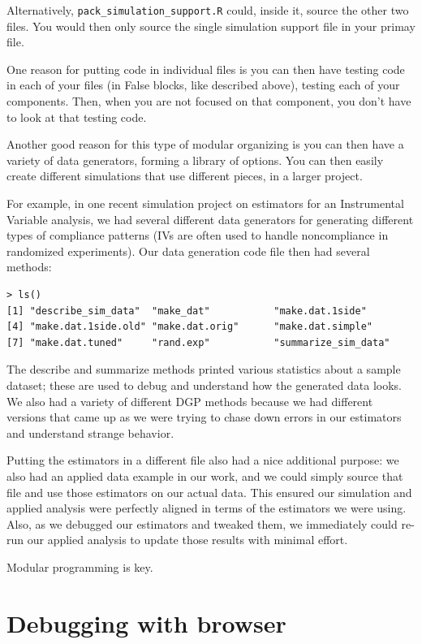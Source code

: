\documentclass[
]{book}
\begin{document}
Alternatively, \texttt{pack\_simulation\_support.R} could, inside it, source the other two files.
You would then only source the single simulation support file in your primay file.

One reason for putting code in individual files is you can then have testing code in each of your files (in False blocks, like described above), testing each of your components.
Then, when you are not focused on that component, you don't have to look at that testing code.

Another good reason for this type of modular organizing is you can then have a variety of data generators, forming a library of options.
You can then easily create different simulations that use different pieces, in a larger project.

For example, in one recent simulation project on estimators for an Instrumental Variable analysis, we had several different data generators for generating different types of compliance patterns (IVs are often used to handle noncompliance in randomized experiments).
Our data generation code file then had several methods:

\begin{verbatim}
> ls()
[1] "describe_sim_data"  "make_dat"           "make.dat.1side"     
[4] "make.dat.1side.old" "make.dat.orig"      "make.dat.simple"
[7] "make.dat.tuned"     "rand.exp"           "summarize_sim_data"
\end{verbatim}

The describe and summarize methods printed various statistics about a sample dataset; these are used to debug and understand how the generated data looks.
We also had a variety of different DGP methods because we had different versions that came up as we were trying to chase down errors in our estimators and understand strange behavior.

Putting the estimators in a different file also had a nice additional purpose: we also had an applied data example in our work, and we could simply source that file and use those estimators on our actual data.
This ensured our simulation and applied analysis were perfectly aligned in terms of the estimators we were using.
Also, as we debugged our estimators and tweaked them, we immediately could re-run our applied analysis to update those results with minimal effort.

Modular programming is key.

\section{Debugging with browser}\label{debugging-with-browser}
\end{document}
